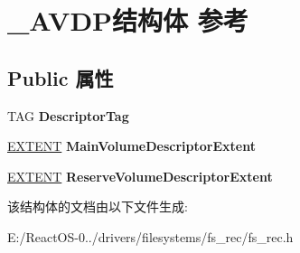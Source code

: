 \hypertarget{struct___a_v_d_p}{}\section{\+\_\+\+A\+V\+D\+P结构体 参考}
\label{struct___a_v_d_p}
\subsection*{Public 属性}
\begin{DoxyCompactItemize}
\item 
\mbox{\label{struct___a_v_d_p_a39f0fef22a730ce9732c8e133b0016a9}} 
T\+AG {\bfseries Descriptor\+Tag}
\item 
\mbox{\label{struct___a_v_d_p_ac005dc89f8c0c927cce9226e79425caf}} 
\hyperlink{struct___e_x_t_e_n_t}{E\+X\+T\+E\+NT} {\bfseries Main\+Volume\+Descriptor\+Extent}
\item 
\mbox{\label{struct___a_v_d_p_a6e13e5a7ec1dacd1b75b544d3770cc8c}} 
\hyperlink{struct___e_x_t_e_n_t}{E\+X\+T\+E\+NT} {\bfseries Reserve\+Volume\+Descriptor\+Extent}
\end{DoxyCompactItemize}


该结构体的文档由以下文件生成\+:\begin{DoxyCompactItemize}
\item 
E\+:/\+React\+O\+S-\/0../drivers/filesystems/fs\+\_\+rec/fs\+\_\+rec.\+h\end{DoxyCompactItemize}
